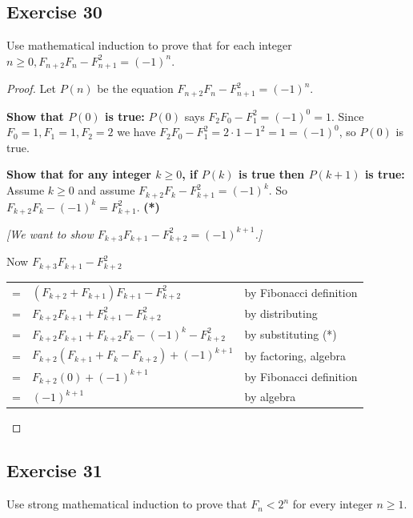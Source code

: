 \documentclass[14pt]{extarticle}
\newcommand{\cy}{\color{cyan}}
\begin{document}
\subsection{Exercise 30}
Use mathematical induction to prove that for each integer $n \geq 0, F_{n + 2}F_n - F_{n+1}^2 = (-1)^n$.

\begin{proof}
Let $P(n)$ be the equation \(F_{n + 2}F_n - F_{n+1}^2 = (-1)^n\).

{\bf Show that \(P(0)\) is true:} \(P(0)\) says \(F_2 F_0 - F_1^2 = (-1)^0 = 1\). Since $F_0 = 1, F_1 = 1, F_2 = 2$ we 
have \(F_2 F_0 - F_1^2 = 2 \cdot 1 - 1^2 = 1 = (-1)^0\), so \(P(0)\) is true.

{\bf Show that for any integer \(k \geq 0\), if $P(k)$ is true then \(P(k+1)\) is true:} Assume \(k \geq 0\) and 
assume \(F_{k + 2}F_k - F_{k+1}^2 = (-1)^k\). So \(F_{k + 2}F_k - (-1)^k = F_{k+1}^2\). {\bf (*)}

{\it [We want to show \(F_{k + 3}F_{k+1} - F_{k+2}^2 = (-1)^{k+1}\).]} 

Now $F_{k + 3}F_{k+1} - F_{k+2}^2$

\begin{tabular}{cll}
= & $(F_{k + 2} + F_{k + 1})F_{k+1} - F_{k+2}^2$ & {\cy by Fibonacci definition} \\
= & $F_{k + 2}F_{k + 1} + F_{k+1}^2 - F_{k+2}^2$ & {\cy by distributing} \\
= & $F_{k + 2}F_{k + 1} + F_{k + 2}F_k - (-1)^k - F_{k+2}^2$ & {\cy by substituting (*)} \\
= & $F_{k + 2}(F_{k + 1} + F_k - F_{k+2}) + (-1)^{k+1}$ & {\cy by factoring, algebra} \\
= & $F_{k + 2}(0) + (-1)^{k+1}$ & {\cy by Fibonacci definition} \\
= & $(-1)^{k+1}$ & {\cy by algebra}
\end{tabular}
\end{proof}

\subsection{Exercise 31}
Use strong mathematical induction to prove that $F_n < 2^n$ for every integer $n \geq 1$.
\end{document}
